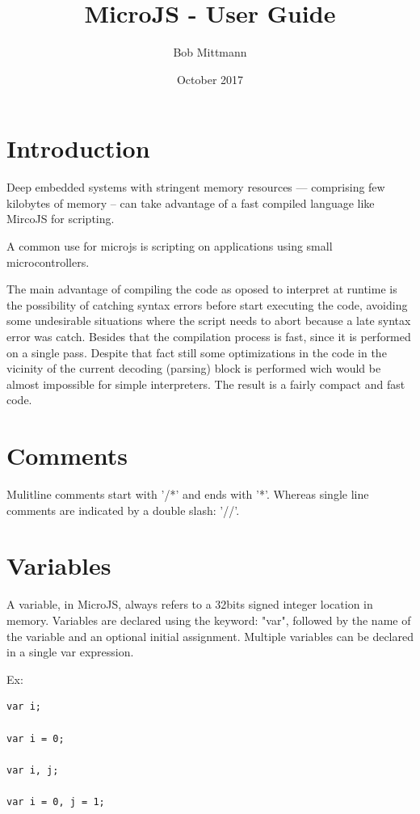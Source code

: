 \documentclass[11pt]{article} %
\title{MicroJS - User Guide}
\author{Bob Mittmann}
\date{October 2017}
\begin{document}
\maketitle
\thispagestyle{empty}
\newpage
{}
\tableofcontents
\newpage
\listoffigures
\newpage
\listoftables
\newpage
{}

\section{Introduction}

Deep embedded systems with stringent memory resources --- comprising few kilobytes of memory -- can take advantage of a fast compiled language like MircoJS for scripting.

A common use for microjs is scripting on applications using small microcontrollers.

The main advantage of compiling the code as oposed to interpret at runtime is the possibility of catching syntax errors before start executing the code, avoiding some undesirable situations where the script needs to abort because a late syntax error was catch. Besides that the compilation process is fast, since it is performed on a single pass. Despite that fact still some optimizations in the code in the vicinity of the current decoding (parsing) block is performed wich would be almost impossible for simple interpreters. The result is a fairly compact and fast code.

\section {Comments}

Mulitline comments start with '/*' and ends with '*'. Whereas single line comments are indicated by a double slash: '//'.

\section {Variables}

A variable, in MicroJS, always refers to a 32bits signed integer location in memory.
Variables are declared using the keyword: "var", followed by the name of the variable and an optional initial assignment. Multiple variables can be declared in a single var expression.

Ex:

\begin{lstlisting}[caption={Example 2},label={lst:verilog-if},language=uJS,frame=single]
var i;

var i = 0;

var i, j;

var i = 0, j = 1;
\end{lstlisting}
\end{document}
